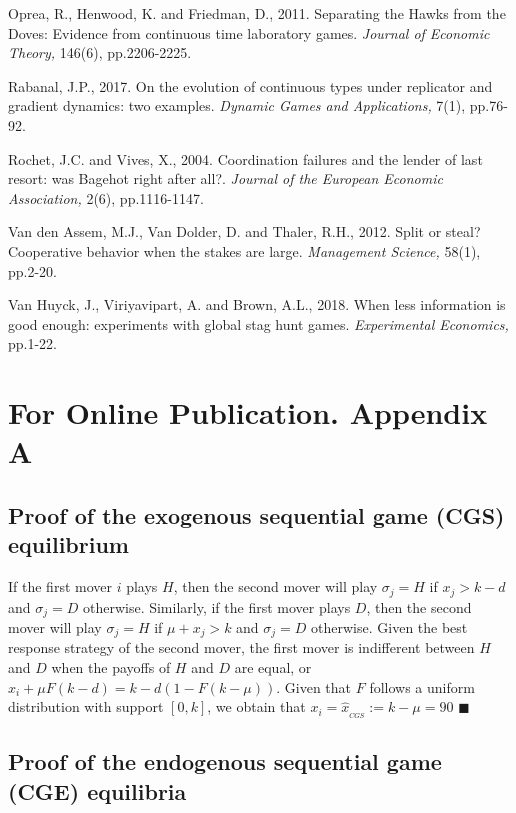 \documentclass[12pt,english]{article}
\begin{document}
\begin{thebibliography}{10}
\bibitem{} Oprea, R., Henwood, K. and Friedman, D., 2011. Separating the Hawks from the Doves: Evidence from continuous time laboratory games. \textit{Journal of Economic Theory,} 146(6), pp.2206-2225.

\bibitem{} Rabanal, J.P., 2017. On the evolution of continuous types under replicator and gradient dynamics: two examples. \textit{Dynamic Games and Applications,} 7(1), pp.76-92.

\bibitem{} Rochet, J.C. and Vives, X., 2004. Coordination failures and the lender of last resort: was Bagehot right after all?. \textit{Journal of the European Economic Association,} 2(6), pp.1116-1147.

\bibitem{} Van den Assem, M.J., Van Dolder, D. and Thaler, R.H., 2012. Split or steal? Cooperative behavior when the stakes are large. \textit{Management Science,} 58(1), pp.2-20.

\bibitem{} Van Huyck, J., Viriyavipart, A. and Brown, A.L., 2018. When less information is good enough: experiments with global stag hunt games. \textit{Experimental Economics,} pp.1-22.


\end{thebibliography}

\newpage
\section*{For Online Publication. Appendix A}

\subsection*{Proof of the exogenous sequential game (CGS) equilibrium}

If the first mover $i$ plays $H$, then the second mover will play $\sigma_j= H$ if $x_j> k-d$ and $\sigma_j= D$ otherwise. Similarly, if the first mover plays $D$, then the second mover will play $\sigma_j= H$ if $\mu+x_j> k$ and  $\sigma_j= D$ otherwise. Given the best response strategy of the second mover, the first mover is indifferent between $H$ and $D$ when the payoffs of $H$ and $D$ are equal, or $x_i + \mu F(k-d) = k - d(1-F(k-\mu))$. Given that $F$ follows a uniform distribution with support $[0,k]$, we obtain that $x_i=\hat{x}_{_{CGS}}:= k-\mu=90$ $\blacksquare$

\subsection*{Proof of the endogenous sequential game (CGE) equilibria}
\end{document}
